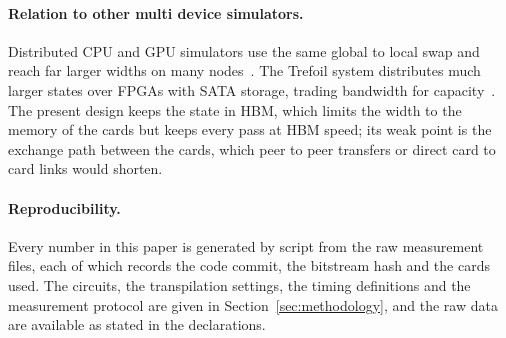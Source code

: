 \paragraph{Relation to other multi device simulators.} Distributed CPU and GPU simulators use the same global to local
swap and reach far larger widths on many nodes~\cite{haner2017petabyte,deraedt2019massively,imamura2022mpiqulacs}. The
Trefoil system distributes much larger states over FPGAs with SATA storage, trading bandwidth for
capacity~\cite{niwase2023trefoil,wei2025qutrefoil}. The present design keeps the state in HBM, which limits the width to
the memory of the cards but keeps every pass at HBM speed; its weak point is the exchange path between the cards, which
peer to peer transfers or direct card to card links would shorten.

\paragraph{Reproducibility.} Every number in this paper is generated by script from the raw measurement files, each of
which records the code commit, the bitstream hash and the cards used. The circuits, the transpilation settings, the
timing definitions and the measurement protocol are given in Section~\ref{sec:methodology}, and the raw data are
available as stated in the declarations.
